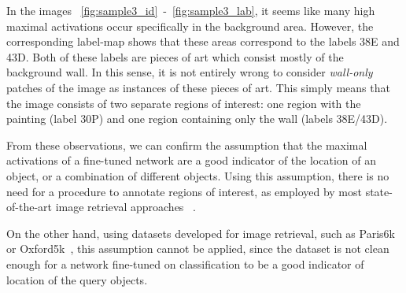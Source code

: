 In the images
~\ref{fig:sample3_id}~-~\ref{fig:sample3_lab}, it seems like many
high maximal activations occur specifically in the background area.
However, the corresponding label-map shows that these areas correspond
to the labels 38E and 43D. Both of these labels are pieces of art which
consist mostly of the background wall. In this sense, it is not
entirely wrong to consider \emph{wall-only} patches of the image as
instances of these pieces of art. This simply means that the image
consists of two separate regions of interest: one region with the painting
(label 30P) and one region containing only the wall (labels 38E/43D).

From these observations, we can confirm the assumption that the
maximal activations of a fine-tuned network are a good indicator of
the location of an object, or a combination of different objects.
Using this assumption, there is no need
for a procedure to annotate regions of interest, as employed by most
state-of-the-art image retrieval approaches
~\cite{gordo_deep_2016,tolias_particular_2015,radenovic_cnn_2016}.

On the other hand, using datasets developed for image retrieval,
such as Paris6k or Oxford5k~\cite{philbin_lost_2008,philbin_object_2007},
this assumption cannot be applied, since the dataset is not clean
enough for a network fine-tuned on classification to be a good indicator
of location of the query objects.

